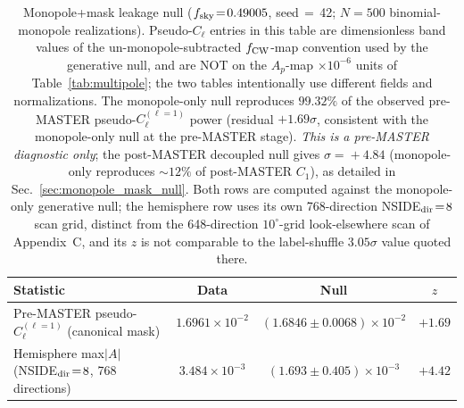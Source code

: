 \documentclass[aps,prd,twocolumn,superscriptaddress,preprintnumbers,nofootinbib,longbibliography,floatfix]{revtex4-2}
\newcommand{\sigmaunit}{\sigma}
\begin{document}
\begin{table}[t]
\caption{Monopole+mask leakage null ($f_{\rm sky}\!=\!0.49005$, seed$\,=\,$42; $N\!=\!500$ binomial-monopole realizations). Pseudo-$C_\ell$ entries in this table are dimensionless band values of the un-monopole-subtracted $f_{\rm CW}$-map convention used by the generative null, and are NOT on the $A_p$-map $\times10^{-6}$ units of Table~\ref{tab:multipole}; the two tables intentionally use different fields and normalizations. The monopole-only null reproduces $99.32\%$ of the observed pre-MASTER pseudo-$C_\ell^{(\ell=1)}$ power (residual $+1.69\sigmaunit$, consistent with the monopole-only null at the pre-MASTER stage). \emph{This is a pre-MASTER diagnostic only}; the post-MASTER decoupled null gives $\sigma\!=\!+4.84$ (monopole-only reproduces $\sim\!12\%$ of post-MASTER $C_1$), as detailed in Sec.~\ref{sec:monopole_mask_null}. Both rows are computed against the monopole-only generative null; the hemisphere row uses its own 768-direction NSIDE${}_{\rm dir}\!=\!8$ scan grid, distinct from the 648-direction $10^\circ$-grid look-elsewhere scan of Appendix~C, and its $z$ is not comparable to the label-shuffle $3.05\sigmaunit$ value quoted there.\label{tab:monopole_mask_null}}
\begin{ruledtabular}
\begin{tabular}{lccc}
\textbf{Statistic} & \textbf{Data} & \textbf{Null} & \textbf{$z$} \\
\hline
Pre-MASTER pseudo-$C_\ell^{(\ell=1)}$ (canonical mask) & $1.6961{\times}10^{-2}$ & $(1.6846{\pm}0.0068){\times}10^{-2}$ & $+1.69$ \\
Hemisphere max$|A|$ (NSIDE${}_{\rm dir}\!=\!8$, 768 directions) & $3.484{\times}10^{-3}$ & $(1.693{\pm}0.405){\times}10^{-3}$ & $+4.42$ \\
\end{tabular}
\end{ruledtabular}
\end{table}
\end{document}
